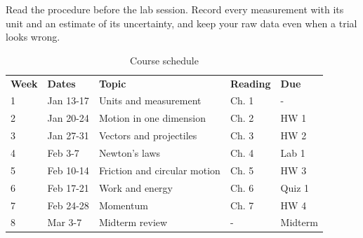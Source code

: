 \documentclass[11pt]{article}
\begin{document}
Read the procedure before the lab session. Record every measurement with its unit and an estimate of its uncertainty, and keep your raw data even when a trial looks wrong. 
\begin{table}[H]\centering
\caption{Course schedule}

\begin{tabular}{lllll}
\textbf{Week} & \textbf{Dates} & \textbf{Topic} & \textbf{Reading} & \textbf{Due} \\
1 & Jan 13-17 & Units and measurement & Ch. 1 & - \\
2 & Jan 20-24 & Motion in one dimension & Ch. 2 & HW 1 \\
3 & Jan 27-31 & Vectors and projectiles & Ch. 3 & HW 2 \\
4 & Feb 3-7 & Newton's laws & Ch. 4 & Lab 1 \\
5 & Feb 10-14 & Friction and circular motion & Ch. 5 & HW 3 \\
6 & Feb 17-21 & Work and energy & Ch. 6 & Quiz 1 \\
7 & Feb 24-28 & Momentum & Ch. 7 & HW 4 \\
8 & Mar 3-7 & Midterm review & - & Midterm \\
\end{tabular}
\end{table}
\end{document}
